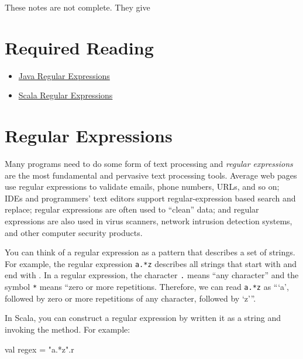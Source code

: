 \newlecture

\begin{instructor}
These notes are not complete. They give
\end{instructor}

\section{Required Reading}

\begin{itemize}

\item \href{http://docs.oracle.com/javase/7/docs/api/java/util/regex/Pattern.html}{Java Regular Expressions}

\item \href{http://www.scala-lang.org/api/current/index.html#scala.util.matching.Regex}{Scala Regular Expressions}

\end{itemize}

\section{Regular Expressions}

Many programs need to do some form of text processing and \emph{regular expressions} are the most fundamental and pervasive text processing tools. Average web pages use regular expressions to validate emails, phone numbers, URLs, and so on; IDEs and programmers' text editors support regular-expression based search and replace; regular expressions are often used to ``clean'' data; and regular expressions are also used in virus scanners, network intrusion detection systems, and other computer security products.

You can think of a regular expression as a pattern that describes a set of strings. For example, the regular expression \texttt{a.*z} describes all strings that start with  and end with . In a regular expression, the character \texttt{.} means ``any character'' and the symbol \texttt{*} means ``zero or more repetitions. Therefore, we can read \texttt{a.*z} as ```a', followed by zero or more repetitions of any character, followed by `z'''.

In Scala, you can construct a regular expression by written it as a string and invoking the  method. For example:
\begin{scalacode}
val regex = "a.*z".r
\end{scalacode}


